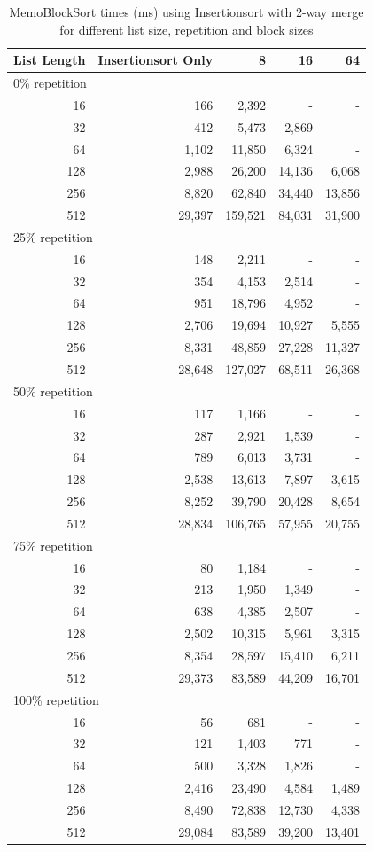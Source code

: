\documentclass[a4paper,12pt]{article}
\begin{document}
\begin{table}[H]
\centering
\begin{tabular}{|r|r|r|r|r|}   \hline
	{List Length} & {Insertionsort Only} & {8} & {16} & {64} \\  \hline
	\multicolumn{5}{|l|}{ 0\% repetition} \\ \hline
	16 &166&2,392&- & - \\ 
	32 &412&5,473&2,869 & -\\ 
	64 &1,102&11,850 & 6,324 &-\\ 
	128 &2,988&26,200&14,136&6,068\\ 
	256 &8,820&62,840&34,440&13,856\\ 
	512 &29,397& 159,521&84,031&31,900\\  \hline
	\multicolumn{5}{|l|}{ 25\% repetition} \\ \hline
	16 &148&2,211&- & - \\ 
	32 &354&4,153&2,514 & -\\ 
	64 &951&18,796 & 4,952&-\\ 
	128 &2,706&19,694&10,927&5,555\\ 
	256 &8,331&48,859&27,228&11,327\\ 
	512 &28,648&127,027&68,511&26,368\\  \hline
	\multicolumn{5}{|l|}{ 50\% repetition} \\ \hline
	16 &117&1,166&- & - \\ 
	32 &287&2,921&1,539 & -\\ 
	64 &789&6,013 & 3,731&-\\ 
	128 &2,538&13,613&7,897&3,615\\ 
	256 &8,252&39,790&20,428&8,654\\ 
	512 &28,834&106,765&57,955&20,755\\  \hline
	\multicolumn{5}{|l|}{ 75\% repetition} \\ \hline
	16 &80&1,184&- & - \\ 
	32 &213&1,950&1,349 & -\\ 
	64 &638&4,385& 2,507&-\\ 
	128 &2,502&10,315&5,961&3,315\\ 
	256 &8,354&28,597&15,410&6,211\\ 
	512 &29,373&83,589&44,209&16,701\\  \hline
	\multicolumn{5}{|l|}{ 100\% repetition} \\ \hline
	16 &56&681&- & - \\ 
	32 &121&1,403&771 & -\\ 
	64 &500&3,328& 1,826&-\\ 
	128 &2,416&23,490&4,584&1,489\\ 
	256 &8,490&72,838&12,730&4,338\\ 
	512 &29,084&83,589&39,200&13,401\\  \hline
\end{tabular}
\caption{MemoBlockSort times (ms) using Insertionsort with 2-way merge for different list size, repetition and block sizes}
\end{table}
\end{document}

